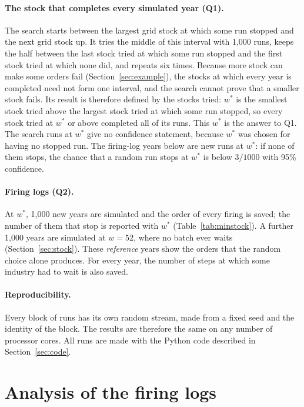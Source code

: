 \documentclass[11pt]{article}
\begin{document}
\paragraph{The stock that completes every simulated year (Q1).} The search starts between the largest grid stock at which some run stopped and the next grid stock up. It tries the middle of this interval with 1{,}000 runs, keeps the half between the last stock tried at which some run stopped and the first stock tried at which none did, and repeats six times. Because more stock can make some orders fail (Section~\ref{sec:example}), the stocks at which every year is completed need not form one interval, and the search cannot prove that a smaller stock fails. Its result is therefore defined by the stocks tried: $w^*$ is the smallest stock tried above the largest stock tried at which some run stopped, so every stock tried at $w^*$ or above completed all of its runs. This $w^*$ is the answer to Q1. The search runs at $w^*$ give no confidence statement, because $w^*$ was chosen for having no stopped run. The firing-log years below are new runs at $w^*$: if none of them stops, the chance that a random run stops at $w^*$ is below $3/1000$ with 95\% confidence.

\paragraph{Firing logs (Q2).} At $w^*$, 1{,}000 new years are simulated and the order of every firing is saved; the number of them that stop is reported with $w^*$ (Table~\ref{tab:minstock}). A further 1{,}000 years are simulated at $w=52$, where no batch ever waits (Section~\ref{sec:stock}). These \emph{reference} years show the orders that the random choice alone produces. For every year, the number of steps at which some industry had to wait is also saved.

\paragraph{Reproducibility.} Every block of runs has its own random stream, made from a fixed seed and the identity of the block. The results are therefore the same on any number of processor cores. All runs are made with the Python code described in Section~\ref{sec:code}.

\section{Analysis of the firing logs}\label{sec:analysis}
\end{document}
